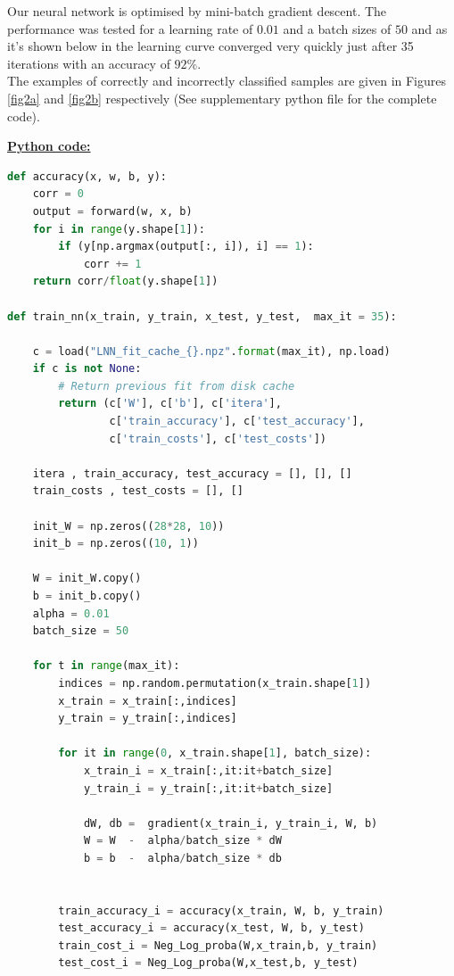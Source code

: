 \documentclass{article}
\begin{document}
\vspace{0.5cm}


\noindent Our  neural  network is optimised  by  mini-batch gradient descent.  The performance was tested for a learning rate of  $0.01$ and a batch sizes of $50$ and  as it's shown below in the learning curve converged very quickly just after 35 iterations  with an accuracy of $92 \%$.\\
The examples of correctly and incorrectly classified samples are given in Figures \ref{fig2a} and \ref{fig2b} respectively (See supplementary python file for the complete code).
\vspace{0.5cm}

\noindent \underline{\textbf{Python code:}} \\
\begin{biomathy}
\begin{lstlisting}[language=python]
def accuracy(x, w, b, y):
    corr = 0
    output = forward(w, x, b)
    for i in range(y.shape[1]):
        if (y[np.argmax(output[:, i]), i] == 1):
            corr += 1
    return corr/float(y.shape[1])

def train_nn(x_train, y_train, x_test, y_test,  max_it = 35):

    c = load("LNN_fit_cache_{}.npz".format(max_it), np.load)
    if c is not None:
        # Return previous fit from disk cache
        return (c['W'], c['b'], c['itera'],
                c['train_accuracy'], c['test_accuracy'],
                c['train_costs'], c['test_costs'])

    itera , train_accuracy, test_accuracy = [], [], []
    train_costs , test_costs = [], []

    init_W = np.zeros((28*28, 10))
    init_b = np.zeros((10, 1))

    W = init_W.copy()
    b = init_b.copy()
    alpha = 0.01
    batch_size = 50

    for t in range(max_it):
        indices = np.random.permutation(x_train.shape[1])
        x_train = x_train[:,indices]
        y_train = y_train[:,indices]

        for it in range(0, x_train.shape[1], batch_size):
            x_train_i = x_train[:,it:it+batch_size]
            y_train_i = y_train[:,it:it+batch_size]

            dW, db =  gradient(x_train_i, y_train_i, W, b)
            W = W  -  alpha/batch_size * dW
            b = b  -  alpha/batch_size * db


        train_accuracy_i = accuracy(x_train, W, b, y_train)
        test_accuracy_i = accuracy(x_test, W, b, y_test)
        train_cost_i = Neg_Log_proba(W,x_train,b, y_train)
        test_cost_i = Neg_Log_proba(W,x_test,b, y_test)


\end{lstlisting}
\end{biomathy}
\end{document}
